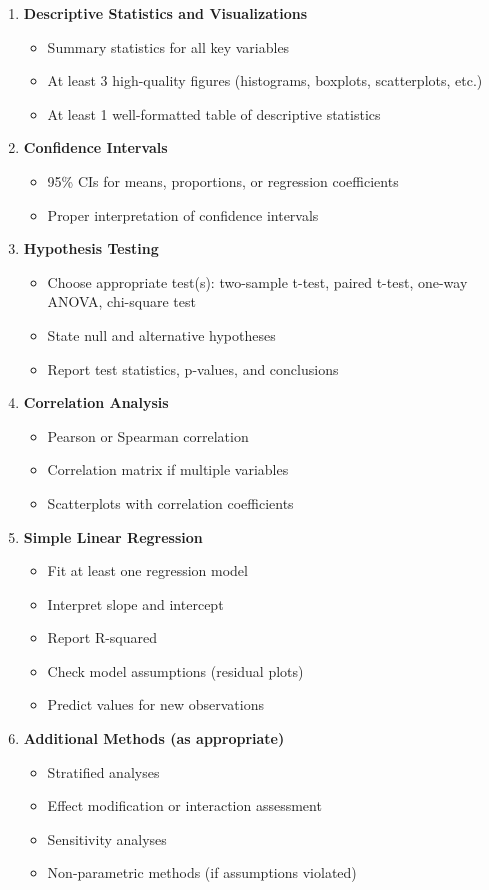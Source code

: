 \documentclass[11pt]{article}
\begin{document}
\begin{enumerate}
\item \textbf{Descriptive Statistics and Visualizations}
  \begin{itemize}
  \item Summary statistics for all key variables
  \item At least 3 high-quality figures (histograms, boxplots, scatterplots, etc.)
  \item At least 1 well-formatted table of descriptive statistics
  \end{itemize}

\item \textbf{Confidence Intervals}
  \begin{itemize}
  \item 95\% CIs for means, proportions, or regression coefficients
  \item Proper interpretation of confidence intervals
  \end{itemize}

\item \textbf{Hypothesis Testing}
  \begin{itemize}
  \item Choose appropriate test(s): two-sample t-test, paired t-test, one-way ANOVA, chi-square test
  \item State null and alternative hypotheses
  \item Report test statistics, p-values, and conclusions
  \end{itemize}

\item \textbf{Correlation Analysis}
  \begin{itemize}
  \item Pearson or Spearman correlation
  \item Correlation matrix if multiple variables
  \item Scatterplots with correlation coefficients
  \end{itemize}

\item \textbf{Simple Linear Regression}
  \begin{itemize}
  \item Fit at least one regression model
  \item Interpret slope and intercept
  \item Report R-squared
  \item Check model assumptions (residual plots)
  \item Predict values for new observations
  \end{itemize}

\item \textbf{Additional Methods (as appropriate)}
  \begin{itemize}
  \item Stratified analyses
  \item Effect modification or interaction assessment
  \item Sensitivity analyses
  \item Non-parametric methods (if assumptions violated)
  \end{itemize}
\end{enumerate}
\end{document}
